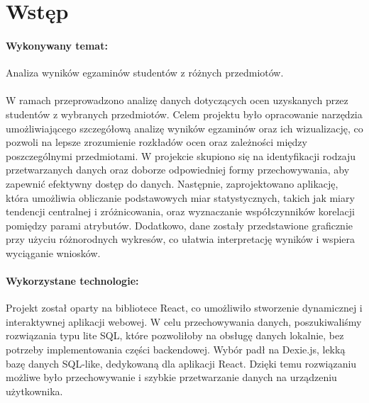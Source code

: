 \section{Wstęp}
\paragraph{Wykonywany temat:} Analiza wyników egzaminów studentów z różnych przedmiotów.

\paragraph{} W ramach przeprowadzono analizę danych dotyczących ocen uzyskanych przez studentów z wybranych przedmiotów. Celem projektu było opracowanie narzędzia umożliwiającego szczegółową analizę wyników egzaminów oraz ich wizualizację, co pozwoli na lepsze zrozumienie rozkładów ocen oraz zależności między poszczególnymi przedmiotami. W projekcie skupiono się na identyfikacji rodzaju przetwarzanych danych oraz doborze odpowiedniej formy przechowywania, aby zapewnić efektywny dostęp do danych. Następnie, zaprojektowano aplikację, która umożliwia obliczanie podstawowych miar statystycznych, takich jak miary tendencji centralnej i zróżnicowania, oraz wyznaczanie współczynników korelacji pomiędzy parami atrybutów. Dodatkowo, dane zostały przedstawione graficznie przy użyciu różnorodnych wykresów, co ułatwia interpretację wyników i wspiera wyciąganie wniosków.

\paragraph{Wykorzystane technologie:} Projekt został oparty na bibliotece React, co umożliwiło stworzenie dynamicznej i interaktywnej aplikacji webowej. W celu przechowywania danych, poszukiwaliśmy rozwiązania typu lite SQL, które pozwoliłoby na obsługę danych lokalnie, bez potrzeby implementowania części backendowej. Wybór padł na Dexie.js, lekką bazę danych SQL-like, dedykowaną dla aplikacji React. Dzięki temu rozwiązaniu możliwe było przechowywanie i szybkie przetwarzanie danych na urządzeniu użytkownika.


